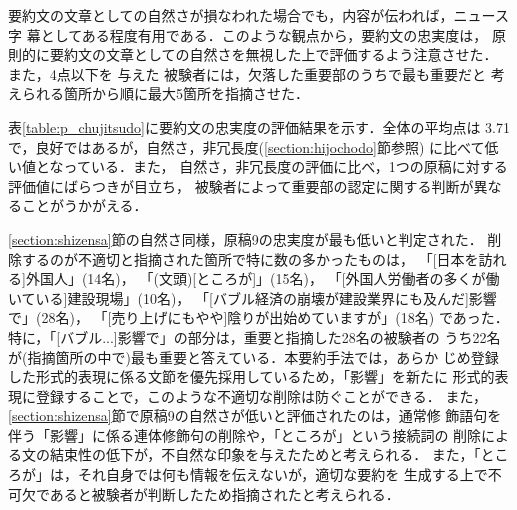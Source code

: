 要約文の文章としての自然さが損なわれた場合でも，内容が伝われば，ニュース字
幕としてある程度有用である．このような観点から，要約文の忠実度は，
原則的に要約文の文章としての自然さを無視した上で評価するよう注意させた．
また，4点以下を
与えた
被験者には，欠落した重要部のうちで最も重要だと
考えられる箇所から順に最大5箇所を指摘させた．

表\ref{table:p_chujitsudo}に要約文の忠実度の評価結果を示す．全体の平均点は
3.71で，良好ではあるが，自然さ，非冗長度(\ref{section:hijochodo}節参照)
に比べて低い値となっている．また，
自然さ，非冗長度の評価に比べ，1つの原稿に対する評価値にばらつきが目立ち，
被験者によって重要部の認定に関する判断が異なることがうかがえる．

\ref{section:shizensa}節の自然さ同様，原稿9の忠実度が最も低いと判定された．
削除するのが不適切と指摘された箇所で特に数の多かったものは，
「[日本を訪れる]外国人」(14名)，
「(文頭)[ところが]」(15名)，
「[外国人労働者の多くが働いている]建設現場」(10名)，
「[バブル経済の崩壊が建設業界にも及んだ]影響で」(28名)，
「[売り上げにもやや]陰りが出始めていますが」(18名)
であった．特に，「[バブル...]影響で」の部分は，重要と指摘した28名の被験者の
うち22名が(指摘箇所の中で)最も重要と答えている．本要約手法では，あらか
じめ登録した形式的表現に係る文節を優先採用しているため，「影響」を新たに
形式的表現に登録することで，このような不適切な削除は防ぐことができる．
また，\ref{section:shizensa}節で原稿9の自然さが低いと評価されたのは，通常修
飾語句を伴う「影響」に係る連体修飾句の削除や，「ところが」という接続詞の
削除による文の結束性の低下が，不自然な印象を与えたためと考えられる．
また，「ところが」は，それ自身では何も情報を伝えないが，適切な要約を
生成する上で不可欠であると被験者が判断したため指摘されたと考えられる．

